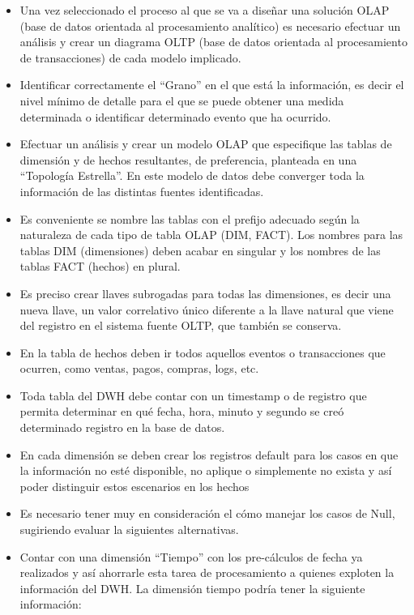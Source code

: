 \documentclass[%
 reprint,
 amsmath,amssymb,
 aps,
]{revtex4-1}
\begin{document}
\begin{itemize}
	\item Una vez seleccionado el proceso al que se va a diseñar una solución OLAP (base de datos orientada al procesamiento analítico) es necesario efectuar un análisis y crear un diagrama OLTP (base de datos orientada al procesamiento de transacciones) de cada modelo implicado.
    \item Identificar correctamente el “Grano” en el que está la información, es decir el nivel mínimo de detalle para el que se puede obtener una medida determinada o identificar determinado evento que ha ocurrido.
    \item Efectuar un análisis y crear un modelo OLAP que especifique las tablas de dimensión y de hechos resultantes, de preferencia, planteada en una “Topología Estrella”. En este modelo de datos debe converger toda la información de las distintas fuentes identificadas.
    \item Es conveniente se nombre las tablas con el prefijo adecuado según la naturaleza de cada tipo de tabla OLAP (DIM, FACT). Los nombres para las tablas DIM (dimensiones) deben acabar en singular y los nombres de las tablas FACT (hechos) en plural.
    \item Es preciso crear llaves subrogadas para todas las dimensiones, es decir una nueva llave, un valor correlativo único diferente a la llave natural que viene del registro en el sistema fuente OLTP, que también se conserva.
    \item En la tabla de hechos deben ir todos aquellos eventos o transacciones que ocurren, como ventas, pagos, compras, logs, etc.
    \item Toda tabla del DWH debe contar con un timestamp o de registro que permita determinar en qué fecha, hora, minuto y segundo se creó determinado registro en la base de datos.
    \item En cada dimensión se deben crear los registros default para los casos en que la información no esté disponible, no aplique o simplemente no exista y así poder distinguir estos escenarios en los hechos
    \item Es necesario tener muy en consideración el cómo manejar los casos de Null, sugiriendo evaluar la siguientes alternativas.
    \item Contar con una dimensión “Tiempo” con los pre-cálculos de fecha ya realizados y así ahorrarle esta tarea de procesamiento a quienes exploten la información del DWH. La dimensión tiempo podría tener la siguiente información:
    

\end{itemize}
\end{document}
